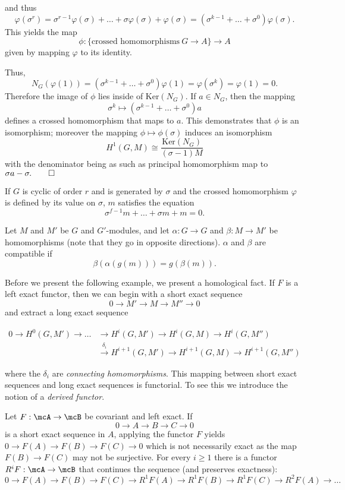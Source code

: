 \documentclass[a4paper, 12pt,oneside,openany]{book}
\begin{document}
and thus $$\varphi(\sigma^r) = \sigma^{r-1} \varphi(\sigma)+\dots+\sigma\varphi(\sigma)+\varphi(\sigma) = (\sigma^{k-1}+\dots+ \sigma^0)\varphi(\sigma).$$ This yields the map $$\phi: \{\text{crossed homomorphisms}\ G \to A\} \to A$$ given by mapping $\varphi$ to its identity. 

Thus, $$N_G(\varphi(1)) = (\sigma^{k-1}+\dots+ \sigma^0)\varphi(1) = \varphi(\sigma^k) = \varphi(1)=0.$$ Therefore the image of $\phi$ lies inside of $\text{Ker}(N_G)$. If $a \in N_G$, then the mapping $$\sigma^k \mapsto (\sigma^{k-1}+\dots+ \sigma^0)a$$ defines a crossed homomorphism that maps to $a$. This demonstrates that $\phi$ is an isomorphism; moreover the mapping $\phi \mapsto \phi(\sigma)$ induces an isomorphism $$H^1(G, M) \cong \frac{\text{Ker}(N_G)}{(\sigma-1)M}$$ with the denominator being as such as principal homomorphism map to $\sigma a-\sigma. \qed$

If $G$ is cyclic of order $r$ and is generated by $\sigma$ and the crossed homomorphism $\varphi$ is defined by its value on $\sigma$, $m$ satisfies the equation $$\sigma^{f-1}m+\dots + \sigma m + m =0.$$ 

Let $M$ and $M'$ be $G$ and $G'$-modules, and let $\alpha: G\to G$ and $\beta: M \to M'$ be homomorphisms (note that they go in opposite directions). $\alpha$ and $\beta$ are compatible if $$\beta(\alpha(g(m)))=g(\beta(m)).$$

Before we present the following example, we present a homological fact. If $F$ is a left exact functor, then we can begin with a short exact sequence $$0 \to M' \to M \to M'' \to 0$$ and extract a long exact sequence 

\begin{align*}
	0 \to H^0(G, M') \to \dots &\to H^i(G, M') \to H^i(G, M) \to H^i(G, M'')  \\
	&\xrightarrow{\delta_i} H^{i+1}(G, M') \to H^{i+1}(G, M) \to H^{i+1}(G, M'') 
\end{align*}

where the $\delta_i$ are \emph{connecting homomorphisms}. This mapping between short exact sequences and long exact sequences is functorial. To see this we introduce the notion of a \emph{derived functor}. 

Let $F: \mcA \to \mcB$ be covariant and left exact. If $$0 \to A \to B \to C\to 0$$ is a short exact sequence in $A$, applying the functor $F$ yields $0 \to F(A) \to F(B) \to F(C)\to 0$ which is not necessarily exact as the map $F(B) \to F(C)$ may not be surjective. For every $i \geq 1$ there is a functor $R^iF: \mcA \to \mcB$ that continues the sequence (and preserves exactness): $$0 \to F(A) \to F(B) \to F(C) \to R^1F(A) \to R^1F(B) \to R^1F(C) \to R^2F(A) \to \dots$$
\end{document}
